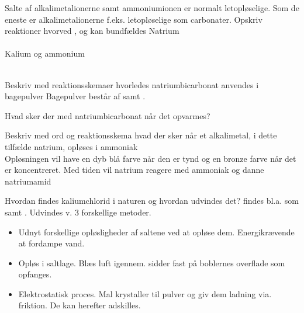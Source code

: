 \begin{flashcard}[Reaktion]{Salte af alkalimetalionerne samt ammoniumionen er normalt letopløselige. Som de eneste er alkalimetalionerne f.eks. letopløselige som carbonater. Opskriv reaktioner hvorved ,  og  kan bundfældes}
Natrium\\
 \\ \vspace{7pt}
Kalium og ammonium\\
\\
\end{flashcard}

\begin{flashcard}[Anvendelse]{Beskriv med reaktionsskemaer hvorledes natriumbicarbonat anvendes i bagepulver}
Bagepulver består af  samt .\\ \vspace{7pt}
\end{flashcard}

\begin{flashcard}[Reaktion]{Hvad sker der med natriumbicarbonat når det opvarmes?}
\end{flashcard}

\begin{flashcard}[Egenskab]{Beskriv med ord og reaktionsskema hvad der sker når et alkalimetal, i dette tilfælde natrium,  opløses i ammoniak}
\\
Opløsningen vil have en dyb blå farve når den er tynd og en bronze farve når det er koncentreret. Med tiden vil natrium reagere med ammoniak og danne natriumamid\\
\end{flashcard}

\begin{flashcard}[Fremstilling]{Hvordan findes kaliumchlorid i naturen og hvordan udvindes det?}
 findes bl.a. som  samt . Udvindes v. 3 forskellige metoder.\\
\begin{itemize}
\item Udnyt forskellige opløsligheder af saltene ved at opløse dem. Energikrævende at fordampe vand.
\item Opløs i saltlage. Blæs luft igennem.  sidder fast på boblernes overflade som opfanges.
\item Elektrostatisk proces. Mal krystaller til pulver og giv dem ladning via. friktion. De kan herefter adskilles.
\end{itemize}
\end{flashcard}

